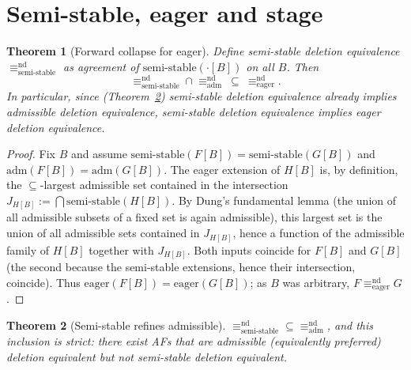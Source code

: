 \documentclass{amsart}
\newtheorem{theorem}{Theorem}
\theoremstyle{remark}
\begin{document}
\section{Semi-stable, eager and stage}\label{sec:ss}

\begin{theorem}[Forward collapse for eager]\label{thm:eager-forward}
Define semi-stable deletion equivalence
$\equiv^{\mathrm{nd}}_{\mathrm{semi\text{-}stable}}$ as agreement of
$\mathrm{semi\text{-}stable}(\cdot[B])$ on all $B$.  Then
\[
\equiv^{\mathrm{nd}}_{\mathrm{semi\text{-}stable}}\cap
\equiv^{\mathrm{nd}}_{\mathrm{adm}}\ \subseteq\
\equiv^{\mathrm{nd}}_{\mathrm{eager}} .
\]
In particular, since (Theorem~\ref{thm:ss-adm}) semi-stable deletion
equivalence already implies admissible deletion equivalence, semi-stable
deletion equivalence implies eager deletion equivalence.
\end{theorem}

\begin{proof}
Fix $B$ and assume $\mathrm{semi\text{-}stable}(F[B])=
\mathrm{semi\text{-}stable}(G[B])$ and $\mathrm{adm}(F[B])=\mathrm{adm}(G[B])$.
The eager extension of $H[B]$ is, by definition, the $\subseteq$-largest
admissible set contained in the intersection $J_{H[B]}:=\bigcap
\mathrm{semi\text{-}stable}(H[B])$.  By Dung's fundamental lemma (the union of
all admissible subsets of a fixed set is again admissible), this largest set is
the union of all admissible sets contained in $J_{H[B]}$, hence a function of the
admissible family of $H[B]$ together with $J_{H[B]}$.  Both inputs coincide for
$F[B]$ and $G[B]$ (the second because the semi-stable extensions, hence their
intersection, coincide).  Thus $\mathrm{eager}(F[B])=\mathrm{eager}(G[B])$; as
$B$ was arbitrary, $F\equiv^{\mathrm{nd}}_{\mathrm{eager}}G$.
\end{proof}

\begin{theorem}[Semi-stable refines admissible]\label{thm:ss-adm}
$\equiv^{\mathrm{nd}}_{\mathrm{semi\text{-}stable}}\subseteq
\equiv^{\mathrm{nd}}_{\mathrm{adm}}$, and this inclusion is \emph{strict}: there
exist AFs that are admissible (equivalently preferred) deletion equivalent but
not semi-stable deletion equivalent.
\end{theorem}
\end{document}

